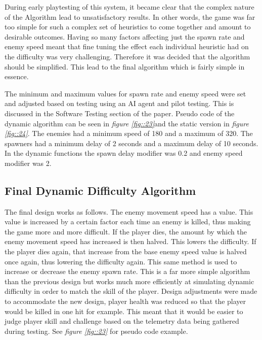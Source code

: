 \documentclass[journal]{IEEEtran}
\begin{document}
During early playtesting of this system, it became clear that the complex nature of the Algorithm lead to unsatisfactory results. In other words, the game was far too simple for such a complex set of heuristics to come together and amount to desirable outcomes. Having so many factors affecting just the spawn rate and enemy speed meant that fine tuning the effect each individual heuristic had on the difficulty was very challenging. Therefore it was decided that the algorithm should be simplified. This lead to the final algorithm which is fairly simple in essence.

The minimum and maximum values for spawn rate and enemy speed were set and adjusted based on testing using an AI agent and pilot testing. This is discussed in the Software Testing section of the paper. Pseudo code of the dynamic algorithm can be seen in \textit{figure \ref{fig::23}}and the static version in \textit{figure \ref{fig::24}}. The enemies had a minimum speed of 180 and a maximum of 320. The spawners had a minimum delay of 2 seconds and a maximum delay of 10 seconds. In the dynamic functions the spawn delay modifier was 0.2 and enemy speed modifier was 2.

\subsection{Final Dynamic Difficulty Algorithm}
The final design works as follows. The enemy movement speed has a value. This value is increased by a certain factor each time an enemy is killed, thus making the game more and more difficult. If the player dies, the amount by which the enemy movement speed has increased is then halved. This lowers the difficulty. If the player dies again, that increase from the base enemy speed value is halved once again, thus lowering the difficulty again. This same method is used to increase or decrease the enemy spawn rate. This is a far more simple algorithm than the previous design but works much more efficiently at simulating dynamic difficulty in order to match the skill of the player. Design adjustments were made to accommodate the new design, player health was reduced so that the player would be killed in one hit for example. This meant that it would be easier to judge player skill and challenge based on the telemetry data being gathered during testing. See \textit{figure \ref{fig::23}} for pseudo code example. 
\end{document}
